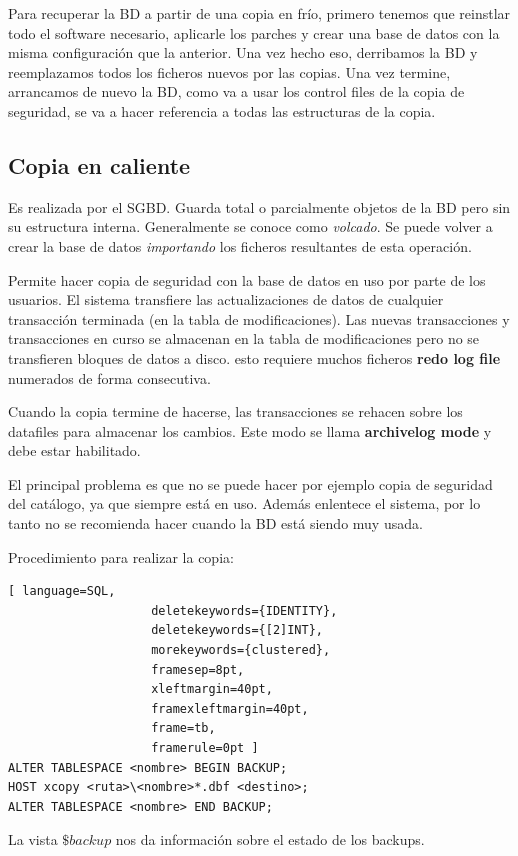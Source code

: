Para recuperar la BD a partir de una copia en frío, primero tenemos que reinstlar todo el software necesario, aplicarle los parches y crear una base de datos con la misma configuración que la anterior. Una vez hecho eso, derribamos la BD y reemplazamos todos los ficheros nuevos por las copias. Una vez termine, arrancamos de nuevo la BD, como va a usar los control files de la copia de seguridad, se va a hacer referencia a todas las estructuras de la copia.

\subsection{Copia en caliente}

Es realizada por el SGBD. Guarda total o parcialmente objetos de la BD pero sin su estructura interna. Generalmente se conoce como \textit{volcado}. Se puede volver a crear la base de datos \textit{importando} los ficheros resultantes de esta operación.

Permite hacer copia de seguridad con la base de datos en uso por parte de los usuarios. El sistema transfiere las actualizaciones de datos de cualquier transacción terminada (en la tabla de modificaciones). Las nuevas transacciones y transacciones en curso se almacenan en la tabla de modificaciones pero no se transfieren bloques de datos a disco. esto requiere muchos ficheros \textbf{redo log file} numerados de forma consecutiva.

Cuando la copia termine de hacerse, las transacciones se rehacen sobre los datafiles para almacenar los cambios. Este modo se llama \textbf{archivelog mode} y debe estar habilitado.

El principal problema es que no se puede hacer por ejemplo copia de seguridad del catálogo, ya que siempre está en uso. Además enlentece el sistema, por lo tanto no se recomienda hacer cuando la BD está siendo muy usada.

Procedimiento para realizar la copia:
\begin{lstlisting}[ language=SQL,
                    deletekeywords={IDENTITY},
                    deletekeywords={[2]INT},
                    morekeywords={clustered},
                    framesep=8pt,
                    xleftmargin=40pt,
                    framexleftmargin=40pt,
                    frame=tb,
                    framerule=0pt ]
ALTER TABLESPACE <nombre> BEGIN BACKUP;
HOST xcopy <ruta>\<nombre>*.dbf <destino>;
ALTER TABLESPACE <nombre> END BACKUP;
\end{lstlisting}
La vista $\$backup$ nos da información sobre el estado de los backups.

